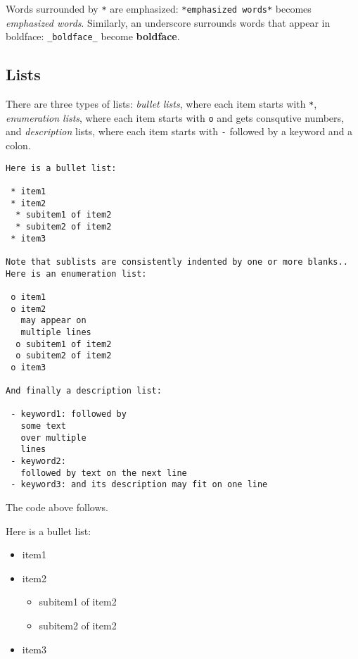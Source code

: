 \documentclass[twoside]{article}
\begin{document}
Words surrounded by {\fontsize{10pt}{10pt}\verb!*!} are emphasized: {\fontsize{10pt}{10pt}\verb!*emphasized words*!} becomes
\emph{emphasized words}. Similarly, an underscore surrounds words that
appear in boldface: {\fontsize{10pt}{10pt}\verb!_boldface_!} become \textbf{boldface}.

\subsection{Lists}

There are three types of lists: \emph{bullet lists}, where each item starts
with {\fontsize{10pt}{10pt}\verb!*!}, \emph{enumeration lists}, where each item starts with {\fontsize{10pt}{10pt}\verb!o!} and gets
consqutive numbers,
and \emph{description} lists, where each item starts with {\fontsize{10pt}{10pt}\verb!-!} followed
by a keyword and a colon.
\begin{Verbatim}
Here is a bullet list:

 * item1
 * item2
  * subitem1 of item2
  * subitem2 of item2
 * item3

Note that sublists are consistently indented by one or more blanks..
Here is an enumeration list:

 o item1
 o item2
   may appear on
   multiple lines
  o subitem1 of item2
  o subitem2 of item2
 o item3

And finally a description list:

 - keyword1: followed by
   some text
   over multiple
   lines
 - keyword2:
   followed by text on the next line
 - keyword3: and its description may fit on one line
\end{Verbatim}
The code above follows.

Here is a bullet list:

\begin{itemize}
 \item item1

 \item item2
\begin{itemize}

  \item subitem1 of item2

  \item subitem2 of item2

\end{itemize}

\noindent
 \item item3
\end{itemize}
\end{document}
